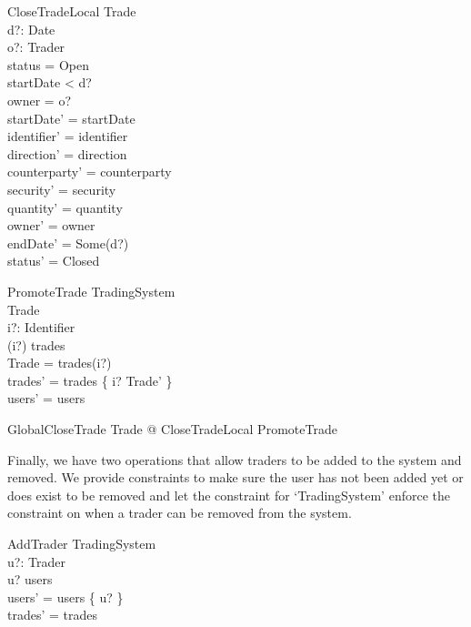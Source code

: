 \documentclass{article}
\begin{document}
\begin{schema}{CloseTradeLocal}
\Delta Trade \\
d?: Date \\ 
o?: Trader \\
\where
status = Open \\ 
startDate < d? \\
owner = o? \\
startDate' = startDate \\
identifier' = identifier \\
direction' = direction \\
counterparty' = counterparty \\
security' = security \\
quantity' = quantity \\
owner' =  owner \\
endDate' = Some(d?) \\ 
status' = Closed \\
\end{schema}

\begin{schema}{PromoteTrade}
\Delta TradingSystem \\
\Delta Trade \\
i?: Identifier \\
\where
(i?) \in \dom trades \\
\theta Trade = trades(i?) \\
trades' = trades \oplus \{ i? \mapsto \theta Trade' \} \\
users' = users \\
\end{schema}

\begin{zed}
GlobalCloseTrade  \exists \Delta Trade @ CloseTradeLocal \land PromoteTrade
\end{zed}

\hspace{-0.7cm} Finally, we have two operations that allow traders to be added to the system and removed. We provide constraints to make sure the user has not been added yet or does exist to be removed and let the constraint for ‘TradingSystem’ enforce the constraint on when a trader can be removed from the system. 

\begin{schema}{AddTrader}
\Delta TradingSystem \\
u?: Trader \\ 
\where
u? \notin users \\
users' = users \cup \{ u? \} \\
trades' = trades \\
\end{schema}
\end{document}
